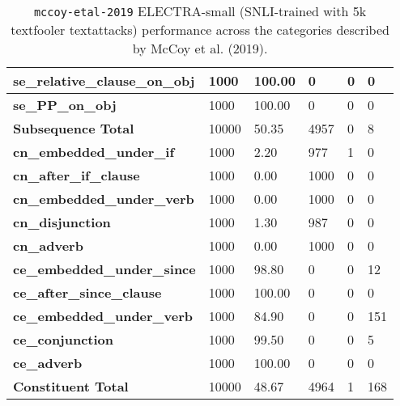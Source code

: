 \begin{table}[!ht]
\begin{tabular}{|p{}|p{}|p{}|p{}|p{}|p{}|}
        \textbf{se\_relative\_clause\_on\_obj} & 1000 & 100.00 & 0 & 0 & 0 \\ \hline
        \textbf{se\_PP\_on\_obj} & 1000 & 100.00 & 0 & 0 & 0 \\ \hline
        \textbf{Subsequence Total} & 10000 & 50.35 & 4957 & 0 & 8 \\ \hline
        \textbf{cn\_embedded\_under\_if} & 1000 & 2.20 & 977 & 1 & 0 \\ \hline
        \textbf{cn\_after\_if\_clause} & 1000 & 0.00 & 1000 & 0 & 0 \\ \hline
        \textbf{cn\_embedded\_under\_verb} & 1000 & 0.00 & 1000 & 0 & 0 \\ \hline
        \textbf{cn\_disjunction} & 1000 & 1.30 & 987 & 0 & 0 \\ \hline
        \textbf{cn\_adverb} & 1000 & 0.00 & 1000 & 0 & 0 \\ \hline
        \textbf{ce\_embedded\_under\_since} & 1000 & 98.80 & 0 & 0 & 12 \\ \hline
        \textbf{ce\_after\_since\_clause} & 1000 & 100.00 & 0 & 0 & 0 \\ \hline
        \textbf{ce\_embedded\_under\_verb} & 1000 & 84.90 & 0 & 0 & 151 \\ \hline
        \textbf{ce\_conjunction} & 1000 & 99.50 & 0 & 0 & 5 \\ \hline
        \textbf{ce\_adverb} & 1000 & 100.00 & 0 & 0 & 0 \\ \hline
        \textbf{Constituent Total} & 10000 & 48.67 & 4964 & 1 & 168 \\ \hline
    \end{tabular}
    \caption{\texttt{mccoy-etal-2019} ELECTRA-small (SNLI-trained with 5k textfooler textattacks) performance across the categories described by McCoy et al. (2019).}
\end{table}

